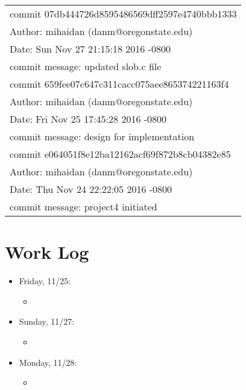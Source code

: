 \documentclass[letterpaper,10pt,onecolumn]{IEEEtran}
\begin{document}
        \begin{center}
        \def\arraystretch{1.1}
        \begin{tabular}{ | p{8.2cm} | }
            \hline
            commit 07db444726d8595486569dff2597e4740bbb1333 \\
            Author: mihaidan (danm@oregonstate.edu) \\
            Date:   Sun Nov 27 21:15:18 2016 -0800 \\
            commit message: updated slob.c file \\
            \hline
            commit 659fee07c647c311cacc075aee865374221163f4 \\
            Author: mihaidan (danm@oregonstate.edu) \\ 
            Date:   Fri Nov 25 17:45:28 2016 -0800 \\
            commit message: design for implementation \\
            \hline
            commit e064051f8e12ba12162acf69f872b8cb04382e85 \\
            Author: mihaidan (danm@oregonstate.edu) \\
            Date:   Thu Nov 24 22:22:05 2016 -0800 \\
            commit message: project4 initiated \\
            \hline
        \end{tabular}
        \end{center}


    
    \vspace{6mm}
    
    
    \section*{Work Log}
    
    
    \begin{itemize}
        \item Friday, 11/25:
            \begin{itemize} 
                \item 
        	\end{itemize}
        \item Sunday, 11/27:
            \begin{itemize} 
                \item 
        	\end{itemize}
        \item Monday, 11/28:
            \begin{itemize} 
                \item 
        	\end{itemize}
    \end{itemize}
    
\end{document}
